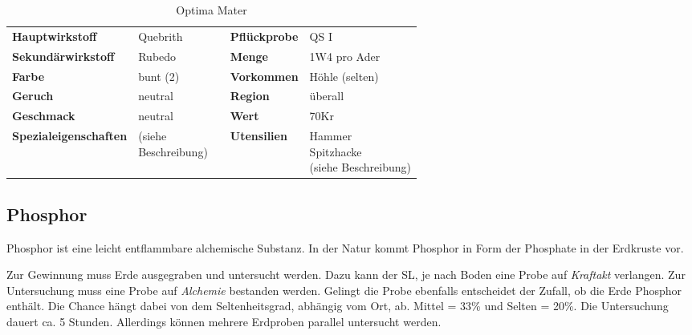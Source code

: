 \begin{table}[H] 
\begin{center} 
\begin{tabular}{|l|l|p{1cm}|l|l|} 
  	\cline{1-2} \cline{4-5} 
  	\textbf{Hauptwirkstoff} & Quebrith && \textbf{Pflückprobe} & QS I \\ \cline{1-2} \cline{4-5} 
  	\textbf{Sekundärwirkstoff} & Rubedo && \textbf{Menge} & 1W4 pro Ader \\ \cline{1-2} \cline{4-5} 
  	\textbf{Farbe} & bunt (2) && \textbf{Vorkommen} & Höhle (selten) \\ \cline{1-2} \cline{4-5} 
  	\textbf{Geruch} & neutral && \textbf{Region} & überall \\ \cline{1-2} \cline{4-5} 
  	\textbf{Geschmack} & neutral && \textbf{Wert} & 70Kr \\ \cline{1-2} \cline{4-5} 
  	\textbf{Spezialeigenschaften} & \brcell{(siehe \\ Beschreibung)} && \textbf{Utensilien} & \brcell{Hammer \\ Spitzhacke \\ (siehe Beschreibung)} \\ \cline{1-2} \cline{4-5} 
\end{tabular} 
\end{center} 
\caption{Optima Mater} 
\label{tab:optima_mater} 
\end{table}


\subsection{Phosphor}
Phosphor ist eine leicht entflammbare alchemische Substanz. In der Natur kommt Phosphor in Form der Phosphate in der Erdkruste vor. 

Zur Gewinnung muss Erde ausgegraben und untersucht werden. Dazu kann der SL, je nach Boden eine Probe auf \textit{Kraftakt} verlangen. Zur Untersuchung muss eine Probe auf \textit{Alchemie} bestanden werden. Gelingt die Probe ebenfalls entscheidet der Zufall, ob die Erde Phosphor enthält. Die Chance hängt dabei von dem Seltenheitsgrad, abhängig vom Ort, ab. Mittel = 33\% und Selten = 20\%. Die Untersuchung dauert ca. 5 Stunden. Allerdings können mehrere Erdproben parallel untersucht werden.

